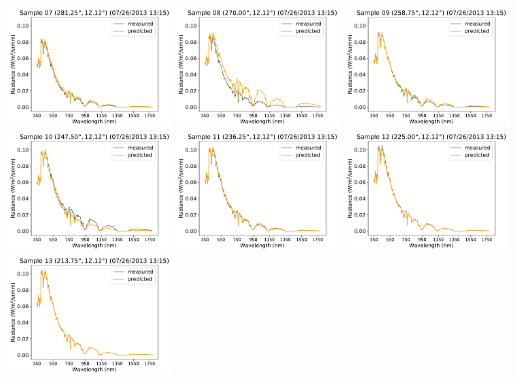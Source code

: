 \begin{center}
\includegraphics[width=0.325\textwidth]{img/07261315_s07.pdf}
\includegraphics[width=0.325\textwidth]{img/07261315_s08.pdf}
\includegraphics[width=0.325\textwidth]{img/07261315_s09.pdf}\\
\includegraphics[width=0.325\textwidth]{img/07261315_s10.pdf}
\includegraphics[width=0.325\textwidth]{img/07261315_s11.pdf}
\includegraphics[width=0.325\textwidth]{img/07261315_s12.pdf}\\
\includegraphics[width=0.325\textwidth]{img/07261315_s13.pdf}

\end{center}
